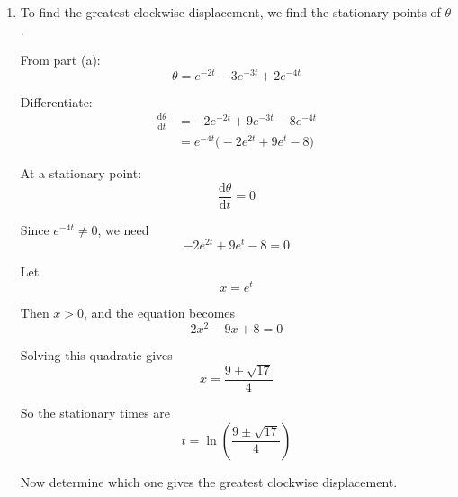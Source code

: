 \documentclass[leqno]{article}
\begin{document}
\begin{enumerate}[
  label=\textbf{\arabic*.},
  leftmargin=*,
  topsep=0pt,
  partopsep=0pt,
  parsep=0pt
]
\begin{djsSolution}
\begin{enumerate}[label=\textbf{(\alph*)}]
So the general solution is
\[
\theta=Ae^{-2t}+Be^{-3t}+2e^{-4t}
\]

Now use the initial conditions.

At \(t=0\), the pointer is passing through its rest position, so
\[
\theta(0)=0
\]

Also, clockwise is taken as positive, and the initial angular velocity is \(1\,\mathrm{rad\,s^{-1}}\) anticlockwise, so when \(t=0\), \(\frac{\mathrm{d}\theta}{\mathrm{d}t}=-1\).

Differentiate \(\theta\):
\[
\frac{\mathrm{d}\theta}{\mathrm{d}t}=-2Ae^{-2t}-3Be^{-3t}-8e^{-4t}
\]

When \(t=0\):
\begin{align*}
A+B+2&=0\\
-2A-3B-8&=-1
\end{align*}

So
\begin{align*}
A+B&=-2\\
2A+3B&=-7
\end{align*}

From \(A+B=-2\), we have \(2A+2B=-4\). Subtracting this from \(2A+3B=-7\) gives
\[
B=-3
\]

Then
\[
A=-2-(-3)=1
\]

Therefore
\[
\theta=e^{-2t}-3e^{-3t}+2e^{-4t}
\]

\item To find the greatest clockwise displacement, we find the stationary points of \(\theta\).

From part (a):
\[
\theta=e^{-2t}-3e^{-3t}+2e^{-4t}
\]

Differentiate:
\begin{align*}
\frac{\mathrm{d}\theta}{\mathrm{d}t}
&=-2e^{-2t}+9e^{-3t}-8e^{-4t}\\
&=e^{-4t}\bigl(-2e^{2t}+9e^t-8\bigr)
\end{align*}

At a stationary point:
\[
\frac{\mathrm{d}\theta}{\mathrm{d}t}=0
\]

Since \(e^{-4t}\neq 0\), we need
\[
-2e^{2t}+9e^t-8=0
\]

Let
\[
x=e^t
\]

Then \(x>0\), and the equation becomes
\[
2x^2-9x+8=0
\]

Solving this quadratic gives
\[
x=\frac{9\pm\sqrt{17}}{4}
\]

So the stationary times are
\[
t=\ln\left(\frac{9\pm\sqrt{17}}{4}\right)
\]

Now determine which one gives the greatest clockwise displacement.


\end{enumerate}
\end{djsSolution}
\end{enumerate}
\end{document}
